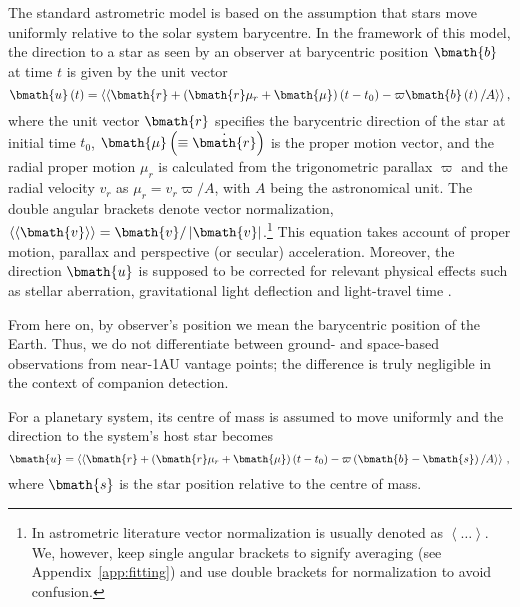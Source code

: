\documentclass[fleqn,usenatbib,useAMS,usedcolumn]{mnras}
\begin{document}
The standard astrometric model is based on the assumption that stars move uniformly relative to the solar system barycentre. In the framework of this model, the direction to a star as seen by an observer at barycentric position $\bmath{b}$ at time $t$ is given by the unit vector \citep[][Eq.~(4)]{lindegrenAGIS2012}
\begin{equation}\label{eq:uStar}
 \bmath{u}\left(t\right)=
 \left\langle\left\langle\bmath{r}+\left(\bmath{r}\mu_r+\bmath{\mu}\right)\left(t-t_0\right)-
 \varpi\bmath{b}\left(t\right)/A\right\rangle\right\rangle,
\end{equation}
where the unit vector $\bmath{r}$ specifies the barycentric direction of the star at initial time $t_0$, $\bmath{\mu}\left(\equiv\dot{\bmath{r}}\right)$ is the proper motion vector, and the radial proper motion $\mu_r$ is calculated from the trigonometric parallax  $\varpi$ and the radial velocity $v_r$ as $\mu_r=v_r\varpi/A$, with $A$ being the astronomical unit. The double angular brackets denote vector normalization, $\left\langle\left\langle\bmath{v}\right\rangle\right\rangle=\bmath{v}/\left|\bmath{v}\right|$.\footnote{In astrometric literature vector normalization is usually denoted as $\left\langle\ldots\right\rangle$. We, however, keep single angular brackets to signify averaging (see Appendix~\ref{app:fitting}) and use double brackets for normalization to avoid confusion.} This equation takes account of proper motion, parallax and perspective (or secular) acceleration. Moreover, the direction $\bmath{u}$ is supposed to be corrected for relevant physical effects such as stellar aberration, gravitational light deflection \citep{klioner2003} and light-travel time \citep{Butkevich+Lindegren2014}.

From here on, by observer's position we mean the barycentric position of the Earth. Thus, we do not differentiate between ground- and space-based observations from near-1AU vantage points; the difference is truly negligible in the context of companion detection.

For a planetary system, its centre of mass is assumed to move uniformly and the direction to the system's host star becomes
\begin{equation}\label{eq:uExo}
 \bmath{u}=
 \left\langle\left\langle\bmath{r}+\left(\bmath{r}\mu_r+\bmath{\mu}\right)\left(t-t_0\right)-
 \varpi\left(\bmath{b}-\bmath{s}\right)/A\right\rangle\right\rangle\,,
\end{equation}
where $\bmath{s}$ is the star position relative to the centre of mass.
\end{document}
